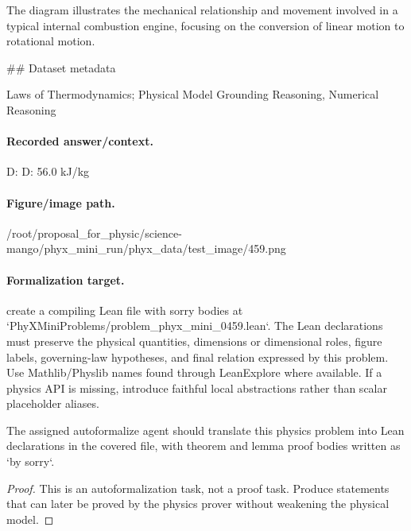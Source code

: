 The diagram illustrates the mechanical relationship and movement involved in a typical internal combustion engine, focusing on the conversion of linear motion to rotational motion.

\#\# Dataset metadata

Laws of Thermodynamics; Physical Model Grounding Reasoning, Numerical Reasoning

\paragraph{Recorded answer/context.}
D: D: 56.0 kJ/kg

\paragraph{Figure/image path.}
/root/proposal\_for\_physic/science-mango/phyx\_mini\_run/phyx\_data/test\_image/459.png

\paragraph{Formalization target.}
create a compiling Lean file with sorry bodies at `PhyXMiniProblems/problem\_phyx\_mini\_0459.lean`. The Lean declarations must preserve the physical quantities, dimensions or dimensional roles, figure labels, governing-law hypotheses, and final relation expressed by this problem.
Use Mathlib/Physlib names found through LeanExplore where available. If a physics API is missing, introduce faithful local abstractions rather than scalar placeholder aliases.

\begin{theorem}
\label{thm:physics:phyx_mini_0459:target}
The assigned autoformalize agent should translate this physics problem into Lean declarations in the covered file, with theorem and lemma proof bodies written as `by sorry`.
\end{theorem}
\begin{proof}
This is an autoformalization task, not a proof task. Produce statements that can later be proved by the physics prover without weakening the physical model.
\end{proof}

